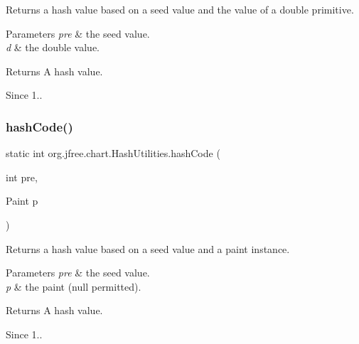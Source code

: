 Returns a hash value based on a seed value and the value of a double primitive.


\begin{DoxyParams}{Parameters}
{\em pre} & the seed value. \\
\hline
{\em d} & the double value.\\
\hline
\end{DoxyParams}
\begin{DoxyReturn}{Returns}
A hash value.
\end{DoxyReturn}
\begin{DoxySince}{Since}
1.. 
\end{DoxySince}
\mbox{\label{classorg_1_1jfree_1_1chart_1_1_hash_utilities_a7e50a32f19cc06e32d63aa2a73a52dd2}} 
\subsubsection{\texorpdfstring{hash\+Code()}{hashCode()}\hspace{0.1cm}{\footnotesize\ttfamily [4/11]}}
{\footnotesize\ttfamily static int org.\+jfree.\+chart.\+Hash\+Utilities.\+hash\+Code (\begin{DoxyParamCaption}\item[{int}]{pre,  }\item[{Paint}]{p }\end{DoxyParamCaption})\hspace{0.3cm}{\ttfamily [static]}}

Returns a hash value based on a seed value and a paint instance.


\begin{DoxyParams}{Parameters}
{\em pre} & the seed value. \\
\hline
{\em p} & the paint ({\ttfamily null} permitted).\\
\hline
\end{DoxyParams}
\begin{DoxyReturn}{Returns}
A hash value.
\end{DoxyReturn}
\begin{DoxySince}{Since}
1.. 
\end{DoxySince}
\mbox{\label{classorg_1_1jfree_1_1chart_1_1_hash_utilities_a7cc50195affa5e10dc1b6d4a360b9517}} 
